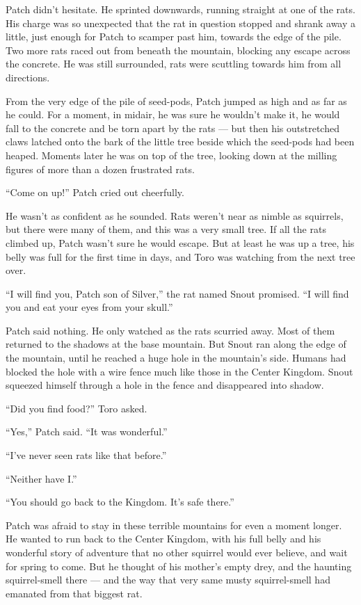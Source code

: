 \documentclass[12pt]{memoir}
\begin{document}
Patch didn’t hesitate. He sprinted downwards, running straight at one
of the rats. His charge was so unexpected that the rat in question
stopped and shrank away a little, just enough for Patch to scamper
past him, towards the edge of the pile. Two more rats raced out from
beneath the mountain, blocking any escape across the concrete. He was
still surrounded, rats were scuttling towards him from all directions.

From the very edge of the pile of seed-pods, Patch jumped as high and
as far as he could. For a moment, in midair, he was sure he wouldn’t
make it, he would fall to the concrete and be torn apart by the rats —
but then his outstretched claws latched onto the bark of the little
tree beside which the seed-pods had been heaped. Moments later he was
on top of the tree, looking down at the milling figures of more than a
dozen frustrated rats.

“Come on up!” Patch cried out cheerfully.

He wasn’t as confident as he sounded. Rats weren’t near as nimble as
squirrels, but there were many of them, and this was a very small
tree. If all the rats climbed up, Patch wasn’t sure he would
escape. But at least he was up a tree, his belly was full for the
first time in days, and Toro was watching from the next tree over.

“I will find you, Patch son of Silver,” the rat named Snout
promised. “I will find you and eat your eyes from your skull.”

Patch said nothing. He only watched as the rats scurried away. Most of
them returned to the shadows at the base mountain. But Snout ran along
the edge of the mountain, until he reached a huge hole in the
mountain’s side. Humans had blocked the hole with a wire fence much
like those in the Center Kingdom. Snout squeezed himself through a
hole in the fence and disappeared into shadow.

“Did you find food?” Toro asked.

“Yes,” Patch said. “It was wonderful.”

“I’ve never seen rats like that before.”

“Neither have I.”

“You should go back to the Kingdom. It’s safe there.”

Patch was afraid to stay in these terrible mountains for even a moment
longer. He wanted to run back to the Center Kingdom, with his full
belly and his wonderful story of adventure that no other squirrel
would ever believe, and wait for spring to come. But he thought of his
mother’s empty drey, and the haunting squirrel-smell there — and the
way that very same musty squirrel-smell had emanated from that biggest
rat.
\end{document}
